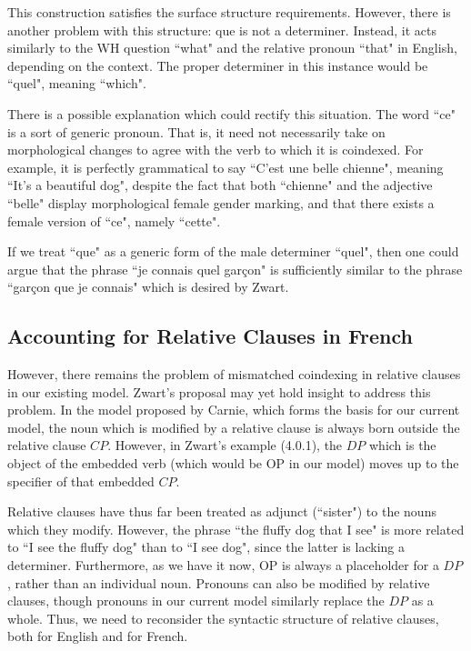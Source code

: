 \documentclass{article}
\begin{document}
This construction satisfies the surface structure requirements. However, there is another problem with this structure: que is not a determiner. Instead, it acts similarly to the WH question ``what" and the relative pronoun ``that" in English, depending on the context. The proper determiner in this instance would be ``quel", meaning ``which".

There is a possible explanation which could rectify this situation. The word ``ce" is a sort of generic pronoun. That is, it need not necessarily take on morphological changes to agree with the verb to which it is coindexed. For example, it is perfectly grammatical to say ``C'est une belle chienne", meaning ``It's a beautiful dog", despite the fact that both ``chienne" and the adjective ``belle" display morphological female gender marking, and that there exists a female version of ``ce", namely ``cette". 

If we treat ``que" as a generic form of the male determiner ``quel", then one could argue that the phrase ``je connais quel garçon" is sufficiently similar to the phrase ``garçon que je connais" which is desired by Zwart.

\subsection{Accounting for Relative Clauses in French}

However, there remains the problem of mismatched coindexing in relative clauses in our existing model. Zwart's proposal may yet hold insight to address this problem. In the model proposed by Carnie, which forms the basis for our current model, the noun which is modified by a relative clause is always born outside the relative clause $CP$. However, in Zwart's example (4.0.1), the $DP$ which is the object of the embedded verb (which would be OP in our model) moves up to the specifier of that embedded $CP$. 

Relative clauses have thus far been treated as adjunct (``sister") to the nouns which they modify. However, the phrase ``the fluffy dog that I see" is more related to ``I see the fluffy dog" than to ``I see dog", since the latter is lacking a determiner. Furthermore, as we have it now, OP is always a placeholder for a $DP$, rather than an individual noun. Pronouns can also be modified by relative clauses, though pronouns in our current model similarly replace the $DP$ as a whole. Thus, we need to reconsider the syntactic structure of relative clauses, both for English and for French.
\end{document}
